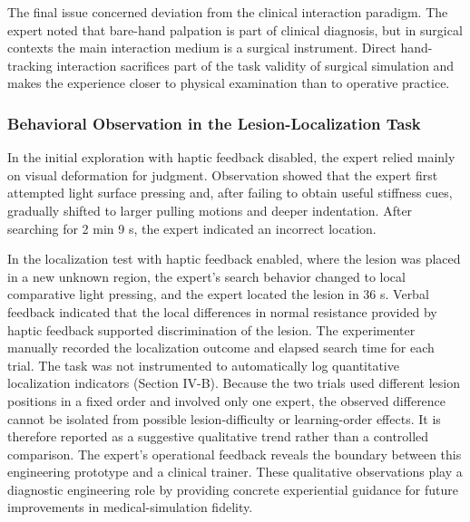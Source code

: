 \documentclass{ieeeaccess}
\begin{document}
The final issue concerned deviation from the clinical interaction paradigm. The expert noted that bare-hand palpation is part of clinical diagnosis, but in surgical contexts the main interaction medium is a surgical instrument. Direct hand-tracking interaction sacrifices part of the task validity of surgical simulation and makes the experience closer to physical examination than to operative practice.

\subsubsection{Behavioral Observation in the Lesion-Localization Task}
In the initial exploration with haptic feedback disabled, the expert relied mainly on visual deformation for judgment. Observation showed that the expert first attempted light surface pressing and, after failing to obtain useful stiffness cues, gradually shifted to larger pulling motions and deeper indentation. After searching for 2 min 9 s, the expert indicated an incorrect location.

In the localization test with haptic feedback enabled, where the lesion was placed in a new unknown region, the expert's search behavior changed to local comparative light pressing, and the expert located the lesion in 36 s. Verbal feedback indicated that the local differences in normal resistance provided by haptic feedback supported discrimination of the lesion. The experimenter manually recorded the localization outcome and elapsed search time for each trial. The task was not instrumented to automatically log quantitative localization indicators (Section IV-B). Because the two trials used different lesion positions in a fixed order and involved only one expert, the observed difference cannot be isolated from possible lesion-difficulty or learning-order effects. It is therefore reported as a suggestive qualitative trend rather than a controlled comparison.
The expert's operational feedback reveals the boundary between this engineering prototype and a clinical trainer. These qualitative observations play a diagnostic engineering role by providing concrete experiential guidance for future improvements in medical-simulation fidelity.
\end{document}
